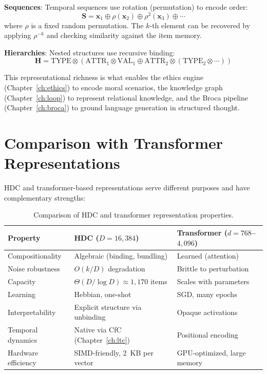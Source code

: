 \documentclass[12pt]{book}
\newcommand{\bind}{\otimes}
\newcommand{\bundle}{\oplus}
\begin{document}
\textbf{Sequences}: Temporal sequences use rotation (permutation) to encode order:
\begin{equation}
\mathbf{S} = \mathbf{x}_1 \bundle \rho(\mathbf{x}_2) \bundle \rho^2(\mathbf{x}_3) \bundle \cdots
\end{equation}
where $\rho$ is a fixed random permutation. The $k$-th element can be recovered by applying $\rho^{-k}$ and checking similarity against the item memory.

\textbf{Hierarchies}: Nested structures use recursive binding:
\begin{equation}
\mathbf{H} = \text{TYPE} \bind (\text{ATTR}_1 \bind \text{VAL}_1 \bundle \text{ATTR}_2 \bind (\text{TYPE}_2 \bind \cdots))
\end{equation}

This representational richness is what enables the ethics engine (Chapter~\ref{ch:ethics}) to encode moral scenarios, the knowledge graph (Chapter~\ref{ch:loop}) to represent relational knowledge, and the Broca pipeline (Chapter~\ref{ch:broca}) to ground language generation in structured thought.

\section{Comparison with Transformer Representations}

HDC and transformer-based representations serve different purposes and have complementary strengths:

\begin{table}[H]
\centering
\caption{Comparison of HDC and transformer representation properties.}
\label{tab:hdc-transformer}
\begin{tabular}{lll}
\toprule
\textbf{Property} & \textbf{HDC ($D = 16{,}384$)} & \textbf{Transformer ($d = 768$--$4{,}096$)} \\
\midrule
Compositionality & Algebraic (binding, bundling) & Learned (attention) \\
Noise robustness & $O(k/D)$ degradation & Brittle to perturbation \\
Capacity & $\Theta(D/\log D) \approx 1{,}170$ items & Scales with parameters \\
Learning & Hebbian, one-shot & SGD, many epochs \\
Interpretability & Explicit structure via unbinding & Opaque activations \\
Temporal dynamics & Native via CfC (Chapter~\ref{ch:ltc}) & Positional encoding \\
Hardware efficiency & SIMD-friendly, 2~KB per vector & GPU-optimized, large memory \\
\bottomrule
\end{tabular}
\end{table}
\end{document}
